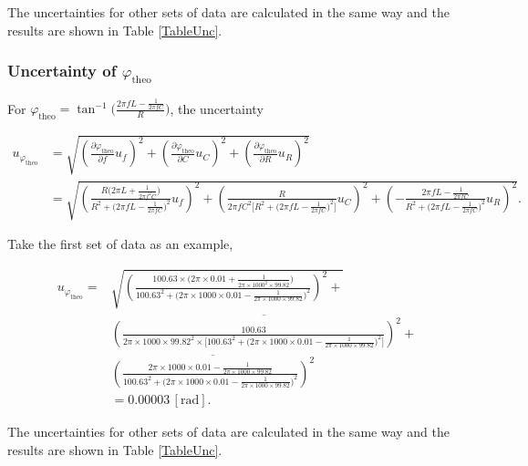 \documentclass{article}
\begin{document}
The uncertainties for other sets of data are calculated in the same way and the results are shown in Table \ref{TableUnc}.

\subsubsection*{Uncertainty of $\varphi_\text{theo}$}
For $\varphi_\text{theo} = \tan^{-1}\bigg(\frac{2\pi fL-\frac{1}{2\pi fC}}{R}\bigg)$, the uncertainty

\begin{align*}
    u_{\varphi_\text{theo}} & = \sqrt{(\frac{\partial \varphi_\text{theo}}{\partial f}u_f)^2 + (\frac{\partial \varphi_\text{theo}}{\partial C}u_C)^2 + (\frac{\partial \varphi_\text{theo}}{\partial R}u_R)^2}                                                                                                                                               \\
                            & = \sqrt{\left( \frac{R\big(2\pi L +\frac{1}{2\pi f^2 C}\big)}{R^2 + \big(2\pi fL - \frac{1}{2\pi fC}\big)^2} u_f \right)^2 + \left( \frac{R}{2\pi fC^2\big[R^2+\big(2\pi fL - \frac{1}{2\pi fC}\big)^2\big]} u_C \right)^2 + \left(-\frac{2\pi fL-\frac{1}{2\pi fC}}{R^2+\big(2\pi fL-\frac{1}{2\pi fC}\big)^2} u_R \right)^2}.
\end{align*}

Take the first set of data as an example,

\begin{align*}
    u_{\varphi_\text{theo}} = & \sqrt{\left( \frac{100.63\times\big(2\pi\times0.01 +\frac{1}{2\pi\times 1000^2\times 99.82}\big)}{100.63^2 + \big(2\pi\times 1000\times 0.01 - \frac{1}{2\pi\times 1000\times 99.82}\big)^2} \right)^2 +} \\
                              & \overline{\left( \frac{100.63}{2\pi\times 1000\times 99.82^2\times\big[100.63^2+\big(2\pi\times1000\times0.01 - \frac{1}{2\pi\times1000\times99.82}\big)^2\big]} \right)^2 +}                             \\
                              & \overline{\left( \frac{2\pi\times 1000\times0.01-\frac{1}{2\pi\times 1000\times99.82}}{100.63^2+\big(2\pi\times 1000\times0.01-\frac{1}{2\pi\times 1000\times99.82}\big)^2} \right)^2}                    \\
                              & = 0.00003\,[\text{rad}].
\end{align*}

The uncertainties for other sets of data are calculated in the same way and the results are shown in Table \ref{TableUnc}.
\end{document}
